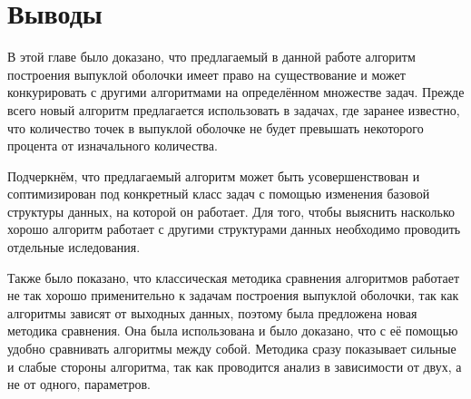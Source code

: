 \section{Выводы}

В этой главе было доказано, что предлагаемый в данной работе алгоритм построения выпуклой оболочки имеет право на существование и может конкурировать с другими алгоритмами на определённом множестве задач. Прежде всего новый алгоритм предлагается использовать в задачах, где заранее известно, что количество точек в выпуклой оболочке не будет превышать некоторого процента от изначального количества.

Подчеркнём, что предлагаемый алгоритм может быть усовершенствован и соптимизирован под конкретный класс задач с помощью изменения базовой структуры данных, на которой он работает. Для того, чтобы выяснить насколько хорошо алгоритм работает с другими структурами данных необходимо проводить отдельные иследования.

Также было показано, что классическая методика сравнения алгоритмов работает не так хорошо применительно к задачам построения выпуклой оболочки, так как алгоритмы зависят от выходных данных, поэтому была предложена новая методика сравнения. Она была использована и было доказано, что с её помощью удобно сравнивать алгоритмы между собой. Методика сразу показывает сильные и слабые стороны алгоритма, так как проводится анализ в зависимости от двух, а не от одного, параметров.
